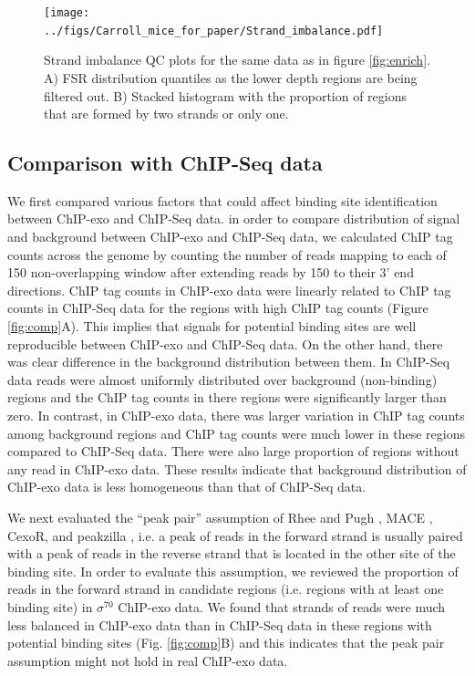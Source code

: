 \documentclass{bmcart}\usepackage[]{graphicx}\usepackage[]{color}
\begin{document}
\begin{figure}[h!]
  \centering  
  \texttt{[image: ../figs/Carroll\_mice\_for\_paper/Strand\_imbalance.pdf]} 
  \caption{Strand imbalance QC plots for the same data as in figure
    \ref{fig:enrich}. A) FSR distribution quantiles as the lower depth
    regions are being filtered out. B) Stacked histogram with the
    proportion of regions that are formed by two strands or only one.}
  \label{fig:strand}
\end{figure}



\subsection{Comparison with ChIP-Seq data}
\label{sec:comp}



We first compared various factors that could affect binding site
identification between ChIP-exo and ChIP-Seq data. in order to compare
distribution of signal and background between ChIP-exo and ChIP-Seq
data, we calculated ChIP tag counts across the genome by counting the
number of reads mapping to each of 150 non-overlapping
window after extending reads by 150 to their 3' end
directions. ChIP tag counts in ChIP-exo data were linearly related to
ChIP tag counts in ChIP-Seq data for the regions with high ChIP tag
counts (Figure \ref{fig:comp}A). This implies that signals for
potential binding sites are well reproducible between ChIP-exo and
ChIP-Seq data. On the other hand, there was clear difference in the
background distribution between them. In ChIP-Seq data reads were
almost uniformly distributed over background (non-binding) regions and
the ChIP tag counts in there regions were significantly larger than
zero. In contrast, in ChIP-exo data, there was larger variation in
ChIP tag counts among background regions and ChIP tag counts were much
lower in these regions compared to ChIP-Seq data. There were also
large proportion of regions without any read in ChIP-exo data. These
results indicate that background distribution of ChIP-exo data is less
homogeneous than that of ChIP-Seq data.

We next evaluated the ``peak pair'' assumption of Rhee and Pugh
\cite{exo1}, MACE \cite{mace}, CexoR, \cite{cexor} and peakzilla
\cite{peakzilla}, i.e. a peak of reads in the forward strand is
usually paired with a peak of reads in the reverse strand that is
located in the other site of the binding site. In order to evaluate
this assumption, we reviewed the proportion of reads in the forward
strand in candidate regions (i.e. regions with at least one binding
site) in $\sigma^{70}$ ChIP-exo data. We found that strands of reads
were much less balanced in ChIP-exo data than in ChIP-Seq data in
these regions with potential binding sites (Fig. \ref{fig:comp}B) and
this indicates that the peak pair assumption might not hold in real
ChIP-exo data.
\end{document}
